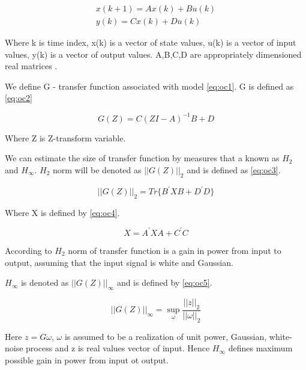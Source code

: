 \documentclass[12pt,a4paper]{report}
\begin{document}
			\begin{equation}\label{eq:oc1}
				\begin{split}
					x(k+1) = Ax(k) + Bu(k)\\
					y(k) = Cx(k) + Du(k)
				\end{split}
			\end{equation}
			
			Where k is time index, x(k) is a vector of state values, u(k) is a vector of input values, y(k) is a vector of output values. A,B,C,D are  appropriately dimensioned real matrices \cite{hazell2008discrete}.
			
			We define G - transfer function associated with model \ref{eq:oc1}. G is defined as \ref{eq:oc2}
			
			\begin{equation}\label{eq:oc2}
				G(Z) = C(ZI - A)^{-1}B+D
			\end{equation}
			
			Where Z is Z-transform variable.
			
			We can estimate the size of transfer function by measures that a known as $H_2$ and $H_\infty$. $H_2$ norm will be denoted as $||G(Z)||_2$ and is defined as \ref{eq:oc3}.
			
			\begin{equation}\label{eq:oc3}
				||G(Z)||_2 = Tr\{ B^{'} XB + D^{'} D \}
			\end{equation}
			
			Where X is defined by \ref{eq:oc4}.
			
			\begin{equation}\label{eq:oc4}
				X = A^{'} XA + C^{'} C
			\end{equation}
			
			According to \cite{hazell2008discrete} 	$H_2$ norm of transfer function is a gain in power from input to output, assuming that the input signal is white and Gaussian.  
			
			$H_\infty$ is denoted as $||G(Z)||_\infty$ and is defined by \ref{eq:oc5}.		
			
			\begin{equation}\label{eq:oc5}
				||G(Z)||_\infty = \sup_{\omega} \dfrac{||z||_2}{||\omega||_2}
			\end{equation}
			
			Here $z = G\omega$, $\omega$ is assumed to be a realization of unit power, Gaussian, white-noise process and z is real values vector of input. Hence $H_\infty$ defines maximum possible gain in power from input ot output.
			
\end{document}
